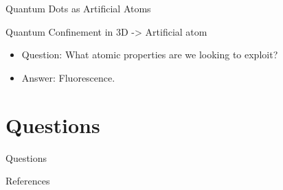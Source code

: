 \documentclass{beamer}
\begin{document}
\begin{frame}{Quantum Dots as Artificial Atoms}{}

  Quantum Confinement in 3D -> Artificial atom
  \begin{itemize}
  \item
   Question: What atomic properties are we looking to exploit?
   \pause
  \item
    Answer: Fluorescence.
  \end{itemize}
\end{frame}


\section*{Questions}

\begin{frame}
\centering
Questions
\end{frame}
\begin{frame}[allowframebreaks]{References}  %

    \def\bibfont{\scriptsize}
    

\end{frame} 
\end{document}
